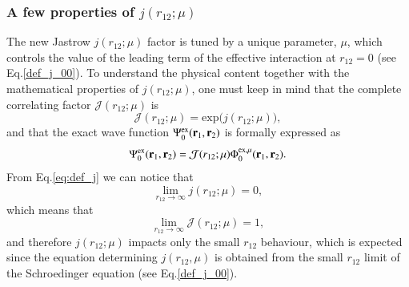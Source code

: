 \documentclass[aip,jcp,reprint,noshowkeys,superscriptaddress]{revtex4-1}
\newcommand{\br}[0]{{\bf {r}}}
\newcommand{\psiex}[0]{\Psi^{\text{ex}}_0}
\newcommand{\phimu}[0]{\Phi^{\text{ex},\mu}_0}
\begin{document}
\subsubsection{A few properties of $j(r_{12};\mu)$}
The new Jastrow $j(r_{12};\mu)$ factor is tuned by a unique parameter, $\mu$, which controls the value of the leading term of the effective interaction at $r_{12}=0$ (see Eq.\eqref{def_j_00}). 
To understand the physical content together with the mathematical properties of $j(r_{12};\mu)$, 
one must keep in mind that the complete correlating factor $\mathcal{J}(r_{12};\mu)$ is 
\begin{equation}
 \mathcal{J}(r_{12};\mu) = \text{exp}\bigg(j(r_{12};\mu)\bigg),
\end{equation}
and that the exact wave function $\psiex(\br{}_1,\br{}_2)$ is formally expressed as 
\begin{equation}
 \psiex(\br{}_1,\br{}_2) = \mathcal{J}(r_{12};\mu) \phimu(\br{}_{1},\br{}_{2}).  
\end{equation}
From Eq.\eqref{eq:def_j} we can notice that 
\begin{equation}
 \lim_{r_{12} \rightarrow \infty}j(r_{12};\mu) = 0,
\end{equation}
which means that 
\begin{equation}
 \lim_{r_{12} \rightarrow \infty}\mathcal{J}(r_{12};\mu) = 1,
\end{equation}
and therefore $j(r_{12};\mu)$ impacts only the small $r_{12}$ behaviour,  
which is expected since the equation determining $j(r_{12},\mu)$ is obtained from the small $r_{12}$ limit of the Schroedinger equation (see Eq.\eqref{def_j_00}). 
\end{document}
